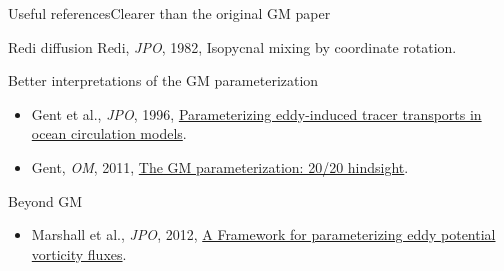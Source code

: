 \documentclass{beamer}
\begin{document}
\begin{frame}{Useful references}{Clearer than the original GM paper}

\begin{exampleblock}{Redi diffusion}
   Redi, {\it JPO}, 1982, Isopycnal mixing by coordinate rotation.
\end{exampleblock}
\vspace{.5cm}

\begin{block}{Better interpretations of the GM parameterization}
  \begin{itemize}
    \item Gent et al., {\it JPO}, 1996, \href{http://google.com}{Parameterizing
    eddy-induced tracer transports in ocean circulation models}.
    \item {Gent}, {\it OM}, 2011, \href{http://www.sciencedirect.com/science/article/pii/S1463500310001253}{ The
     GM parameterization: 20/20 hindsight}.
  \end{itemize}
\end{block}
\vspace{.5cm}
\begin{exampleblock}{Beyond GM}
  \begin{itemize}
    \item Marshall et al., {\it JPO}, 2012, \href{http://journals.ametsoc.org/doi/abs/10.1175/JPO-D-11-048.1}{ A
          Framework for parameterizing eddy potential vorticity fluxes}.
  \end{itemize}
\end{exampleblock}
\end{frame}
\end{document}
